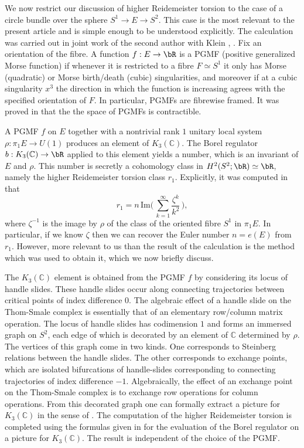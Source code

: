 \documentclass[JEP,XML,SOM,Unicode,NoFloatCountersInSection]{cedram}
\theoremstyle{plain}
\theoremstyle{definition}
\newcommand{\bC}{\mathbb{C}}\newcommand{\bD}{\mathbb{D}}
\begin{document}
We now restrict our discussion of higher Reidemeister torsion to the case of a circle bundle over the sphere $S^1 \to E \to S^2$. This case is the most relevant to the present article and is simple enough to be understood explicitly. The calculation was carried out in joint work of the second author with Klein \cite{IK93a}, \cite{IK93}. Fix an orientation of the fibre. A function $f:E \to \bR$ is a PGMF (positive generalized Morse function) if whenever it is restricted to a fibre $F \simeq S^1$ it only has Morse (quadratic) or Morse birth/death (cubic) singularities, and moreover if at a cubic singularity $x^3$ the direction in which the function is increasing agrees with the specified orientation of $F$. In particular, PGMFs are fibrewise framed. It was proved in \cite{IK93} that the the space of PGMFs is contractible.

A PGMF $f$ on $E$ together with a nontrivial rank $1$ unitary local system \hbox{$\rho : \pi_1E \to U(1)$} produces an element of $K_3(\bC)$. The Borel regulator $b:K_3(\bC) \to \bR$ applied to this element yields a number, which is an invariant of $E$ and $\rho$. This number is secretly a cohomology class in $H^2(S^2; \bR) \simeq \bR$, namely the higher Reidemeister torsion class $r_1$. Explicitly, it was computed in \cite{IK93} that\enlargethispage{.5\baselineskip}%
\[ r_1 =n \, \text{Im}\Big( \, \sum_{k=1}^\infty \frac{\zeta^k}{k^2} \, \Big), \]
where $\zeta^{-1}$ is the image by $\rho$ of the class of the oriented fibre $S^1$ in $\pi_1E$. In particular, if we know $\zeta$ then we can recover the Euler number $n=e(E)$ from $r_1$. However, more relevant to us than the result of the calculation is the method which was used to obtain it, which we now briefly discuss.

The $K_3(\bC)$ element is obtained from the PGMF $f$ by considering its locus of handle slides. These handle slides occur along connecting trajectories between critical points of index difference $0$. The algebraic effect of a handle slide on the Thom-Smale complex is essentially that of an elementary row/column matrix operation. The locus of handle slides has codimension $1$ and forms an immersed graph on $S^2$, each edge of which is decorated by an element of $\bC$ determined by $\rho$. The vertices of this graph come in two kinds. One corresponds to Steinberg relations between the handle slides. The other corresponds to exchange points, which are isolated bifurcations of handle-slides corresponding to connecting trajectories of index difference $-1.$ Algebraically, the effect of an exchange point on the Thom-Smale complex is to exchange row operations for column operations. From this decorated graph one can formally extract a picture for $K_3(\bC)$ in the sense of \cite{K}. The computation of the higher Reidemeister torsion is completed using the formulas given in \cite{IK93} for the evaluation of the Borel regulator on a picture for $K_3(\bC)$. The result is independent of the choice of the PGMF.
\end{document}
